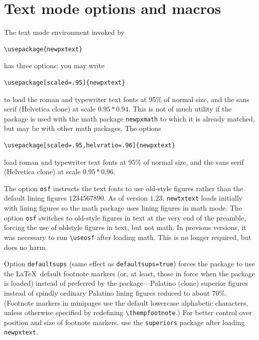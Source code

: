 \documentclass[11pt]{article}
\begin{document}
\section{Text mode options and macros}
The text mode environment invoked by
\begin{verbatim}
\usepackage{newpxtext}
\end{verbatim}
has three options: you may write
\begin{verbatim}
\usepackage[scaled=.95]{newpxtext}
\end{verbatim}
to load the roman and typewriter text fonts at 95\% of normal size, and the sans serif (\textsf{Helvetica} clone) at scale $0.95*0.94$. This is not of much utility if the package is used with the math package {\tt newpxmath} to which it is already matched, but may be with other math packages. The options
\begin{verbatim}
\usepackage[scaled=.95,helvratio=.96]{newpxtext}
\end{verbatim}
load roman and typewriter text fonts at 95\% of normal size, and the sans serif (\textsf{Helvetica} clone) at scale $0.95*0.96$.

The option \texttt{osf} instructs the text fonts to use old-style figures  rather than the default lining figures $1234567890$. As of version $1.23$, {\tt newtxtext} loads initially with lining figures so the math package uses lining figures in math mode. The option {\tt osf} switches to old-style figures in text at the very end of the preamble, forcing the use of oldstyle figures in text, but not math. In previous versions, it was necessary to run 
\verb|\useosf| after loading math. This is no longer required, but does no harm.

Option {\tt defaultsups} (same effect as {\tt defaultsups=true}) forces the package to use the \LaTeX\ default footnote markers (or, at least, those in force when the package is loaded) instead of preferred by the package---Palatino (clone) superior figures instead of spindly ordinary Palatino lining figures reduced to about 70\%. (Footnote markers in minipages use the default lowercase alphabetic characters, unless otherwise specified by redefining \verb|\thempfootnote|.) For better control over position and size of footnote markers, use the {\tt superiors} package after loading {\tt newpxtext}. 
\end{document}
